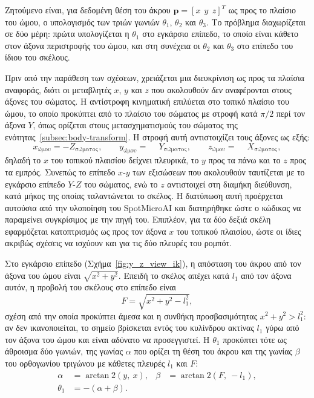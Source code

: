 \documentclass[11pt]{report}
\begin{document}
Ζητούμενο είναι, για δεδομένη θέση του άκρου $\mathbf{p} = [x\ \ y\ \ z]^{T}$ ως
προς το πλαίσιο του ώμου, ο υπολογισμός των τριών γωνιών $\theta_1$, $\theta_2$
και $\theta_3$. Το πρόβλημα διαχωρίζεται σε δύο μέρη: πρώτα υπολογίζεται η
$\theta_1$ στο εγκάρσιο επίπεδο, το οποίο είναι κάθετο στον άξονα περιστροφής του
ώμου, και στη συνέχεια οι $\theta_2$ και $\theta_3$ στο επίπεδο του ίδιου του
σκέλους.

Πριν από την παράθεση των σχέσεων, χρειάζεται μια διευκρίνιση ως προς τα πλαίσια
αναφοράς, διότι οι μεταβλητές $x$, $y$ και $z$ που ακολουθούν \emph{δεν}
αναφέρονται στους άξονες του σώματος. Η αντίστροφη κινηματική επιλύεται στο
τοπικό πλαίσιο του ώμου, το οποίο προκύπτει από το πλαίσιο του σώματος με
στροφή κατά $\pi/2$ περί τον άξονα $Y$, όπως ορίζεται στους μετασχηματισμούς του
σώματος της ενότητας~\ref{subsec:body-transform}. Η στροφή αυτή αντιστοιχίζει
τους άξονες ως εξής:
\begin{equation}
x_{\text{ώμου}} = -Z_{\text{σώματος}}, \qquad
y_{\text{ώμου}} = \phantom{-}Y_{\text{σώματος}}, \qquad
z_{\text{ώμου}} = \phantom{-}X_{\text{σώματος}},
\label{eq:shoulder-frame}
\end{equation}
δηλαδή το $x$ του τοπικού πλαισίου δείχνει πλευρικά, το $y$ προς τα πάνω και το
$z$ προς τα εμπρός. Συνεπώς το επίπεδο $x$-$y$ των εξισώσεων που ακολουθούν
ταυτίζεται με το εγκάρσιο επίπεδο $Y$-$Z$ του σώματος, ενώ το $z$ αντιστοιχεί
στη διαμήκη διεύθυνση, κατά μήκος της οποίας ταλαντώνεται το σκέλος. Η
διατύπωση αυτή προέρχεται αυτούσια από την υλοποίηση του SpotMicroAI
\cite{spotmicroai_project} και διατηρήθηκε ώστε ο κώδικας να παραμείνει
συγκρίσιμος με την πηγή του. Επιπλέον, για τα δύο δεξιά σκέλη εφαρμόζεται
κατοπτρισμός ως προς τον άξονα $x$ του τοπικού πλαισίου, ώστε οι ίδιες ακριβώς
σχέσεις να ισχύουν και για τις δύο πλευρές του ρομπότ.

Στο εγκάρσιο επίπεδο (Σχήμα~\ref{fig:y_z_view_ik}), η απόσταση του άκρου από τον
άξονα του ώμου είναι $\sqrt{x^2+y^2}$. Επειδή το σκέλος απέχει κατά $l_1$ από
τον άξονα αυτόν, η προβολή του σκέλους στο επίπεδο είναι
\begin{equation}
F = \sqrt{x^2 + y^2 - l_1^{2}},
\label{eq:ik-F}
\end{equation}
σχέση από την οποία προκύπτει άμεσα και η συνθήκη προσβασιμότητας
$x^2 + y^2 > l_1^{2}$: αν δεν ικανοποιείται, το σημείο βρίσκεται εντός του
κυλίνδρου ακτίνας $l_1$ γύρω από τον άξονα του ώμου και είναι αδύνατο να
προσεγγιστεί. Η $\theta_1$ προκύπτει τότε ως άθροισμα δύο γωνιών, της γωνίας
$\alpha$ που ορίζει τη θέση του άκρου και της γωνίας $\beta$ του ορθογωνίου
τριγώνου με κάθετες πλευρές $l_1$ και $F$:
\begin{align}
\alpha &= \arctan2(y,\ x), &
\beta  &= \arctan2(F,\ -l_1), \\
\theta_1 &= -(\alpha + \beta). &&
\label{eq:ik-theta1}
\end{align}
\end{document}
